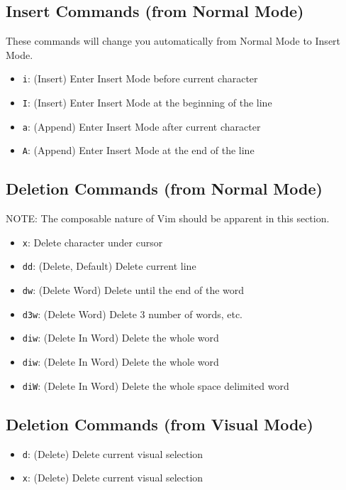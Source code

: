\documentclass[11pt]{article}
\begin{document}
\subsection{Insert Commands (from Normal Mode)}
\label{sec:orgfc05fd2}
These commands will change you automatically from Normal Mode
to Insert Mode.
\begin{itemize}
\item \texttt{i}: (Insert) Enter Insert Mode before current character
\item \texttt{I}: (Insert) Enter Insert Mode at the beginning of the line
\item \texttt{a}: (Append) Enter Insert Mode after current character
\item \texttt{A}: (Append) Enter Insert Mode at the end of the line
\end{itemize}

\subsection{Deletion Commands (from Normal Mode)}
\label{sec:org97f7faf}
NOTE: The composable nature of Vim should be apparent in this section.

\begin{itemize}
\item \texttt{x}: Delete character under cursor
\item \texttt{dd}: (Delete, Default) Delete current line
\item \texttt{dw}: (Delete Word) Delete until the end of the word
\item \texttt{d3w}: (Delete Word) Delete 3 number of words, etc.
\item \texttt{diw}: (Delete In Word) Delete the whole word
\item \texttt{diw}: (Delete In Word) Delete the whole word
\item \texttt{diW}: (Delete In Word) Delete the whole space delimited word
\end{itemize}
\subsection{Deletion Commands (from Visual Mode)}
\label{sec:orgead8ae7}
\begin{itemize}
\item \texttt{d}: (Delete) Delete current visual selection
\item \texttt{x}: (Delete) Delete current visual selection
\end{itemize}
\end{document}
